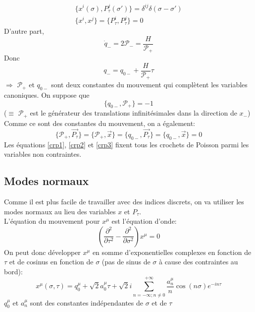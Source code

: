 \documentclass[a4paper,12pt]{article}
\def\xmu{x^\mu}
\def\CP{\mathcal{P}}
\def\pt{P_\tau}
\begin{document}
\begin{equation}
	\begin{aligned}
	\{x^i(\sigma),\pt^j(\sigma')\}=\delta^{ij}\delta(\sigma-\sigma')\\
	\{x^i,x^j\}=\{\pt^i,\pt^j\}=0
	\end{aligned}\label{crp1}
\end{equation}
D'autre part, $$\dot{q}_-=2\CP_-=\frac{H}{\CP_+}$$
Donc $$q_-=q_{0-}+\frac{H}{\CP_+}\tau$$
$\Rightarrow$ $\CP_+$ et $q_{0-}$ sont deux constantes du mouvement qui complètent les variables canoniques. On suppose que 
\begin{equation}
\{q_{0-},\CP_+\}=-1\label{crp2}
\end{equation}
($\equiv$ $\CP_+$ est le générateur des translations infinitésimales dans la direction de $x_-$)
Comme ce sont des constantes du mouvement, on a également:
\begin{equation}
\{\CP_+,\vec{\pt}\}=\{\CP_+,\vec{x}\}=\{q_{0-},\vec{\pt}\}=\{q_{0-},\vec{x}\}=0\label{crp3}
\end{equation}
Les équations \eqref{crp1}, \eqref{crp2} et \eqref{crp3} fixent tous les crochets de Poisson parmi les variables non contraintes.
\subsection{Modes normaux}
Comme il est plus facile de travailler avec des indices discrets, on va utiliser les modes normaux au lieu des variables $x$ et $\pt$.\\
L'équation du mouvement pour $\xmu$ est l'équation d'onde:
$$\left( \frac{\partial^2}{\partial  \tau^2}-\frac{\partial^2}{\partial  \sigma^2}\right) \xmu=0$$
On peut donc développer $\xmu$ en somme d'exponentielles complexes en fonction de $\tau$ et de cosinus en fonction de $\sigma$ (pas de sinus de $\sigma$ à cause des contraintes au bord):
\begin{equation}
\xmu(\sigma,\tau)= q_0^\mu + \sqrt{2}a_0^\mu \tau + \sqrt{2}i\sum_{n=-\infty;n\neq 0}^{+\infty}\frac{a_n^\mu}{n}\cos(n\sigma)e^{-in\tau}
\end{equation}
$q_0^\mu$ et $a_n^\mu$ sont des constantes indépendantes de $\sigma$ et de $\tau$
\end{document}
